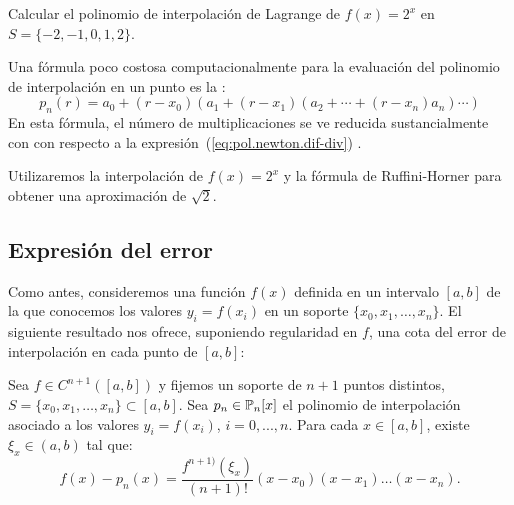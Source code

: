 \begin{example}
   Calcular el polinomio de interpolación de Lagrange de $f(x)=2^x$ en
   $S=\{-2,-1,0,1,2\}$. 
 \end{example}

 Una fórmula poco costosa computacionalmente para la evaluación del
 polinomio de interpolación en un punto es la : 
 \begin{equation*}
   p_n(r) = a_0 + (r-x_0)(a_1 + (r-x_1)(a_2 + \cdots + (r-x_n)a_n)\cdots)
 \end{equation*}
 En esta fórmula, el número de multiplicaciones se ve reducida
 sustancialmente con con respecto a la
 expresión~(\ref{eq:pol.newton.dif-div}) .
 \begin{example}
   Utilizaremos la interpolación de $f(x)=2^x$ y la fórmula de
   Ruffini-Horner para obtener una aproximación de $\sqrt{2}$.
 \end{example}

 \subsection{Expresión del error}
 \label{sec:error-interpol-lagrange}
 Como antes, consideremos una función $f(x)$ definida en un intervalo
 $[a,b]$ de la que conocemos los valores $y_i=f(x_i)$ en un soporte
 $\{x_0,x_1,\dots,x_n\}$. El siguiente resultado nos ofrece, suponiendo
 regularidad en $f$, una cota del error de interpolación en cada punto
 de $[a,b]$:
 \begin{theorem}
   \label{thm:error-interpol-lagrange}
   Sea $f\in C^{n+1}([a,b])$ y fijemos un soporte de $n+1$ puntos
   distintos, $S=\{x_0,x_1,\dots,x_n\}\subset[a,b]$. Sea
   $p_n\in\operatorname{{\mathbb P}}_n[x]$ el polinomio de interpolación asociado a los valores
   $y_i=f(x_i)$, $i=0,...,n$. Para cada $x\in[a,b]$, existe $\xi_x\in
   (a,b)$ tal que:
   \begin{equation}
     \label{eq:expresion-error-interpol}
     f(x)-p_n(x)=\frac{f^{n+1)}(\xi_x)}{(n+1)!} (x-x_0)(x-x_1)\dots(x-x_n).
   \end{equation}
 \end{theorem}

